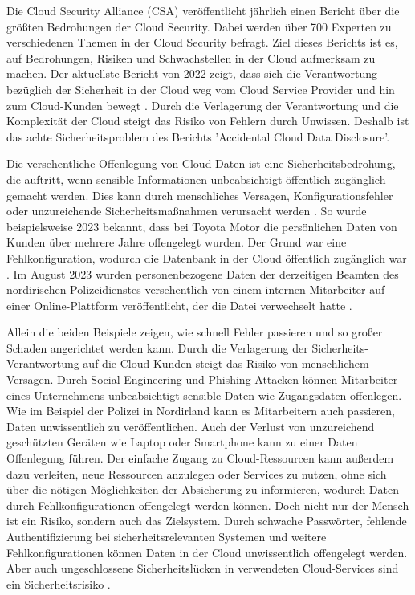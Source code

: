 Die Cloud Security Alliance (CSA) veröffentlicht jährlich einen Bericht über die größten Bedrohungen der Cloud Security. Dabei werden über 700 Experten zu verschiedenen Themen in der Cloud Security befragt. Ziel dieses Berichts ist es, auf Bedrohungen, Risiken und Schwachstellen in der Cloud aufmerksam zu machen. Der aktuellste Bericht von 2022 zeigt, dass sich die Verantwortung bezüglich der Sicherheit in der Cloud weg vom Cloud Service Provider und hin zum Cloud-Kunden bewegt \cite{CloudSecurityAlliance.2022}. %
Durch die Verlagerung der Verantwortung und die Komplexität der Cloud steigt das Risiko von Fehlern durch Unwissen. Deshalb ist das achte Sicherheitsproblem des Berichts 'Accidental Cloud Data Disclosure'.

Die versehentliche Offenlegung von Cloud Daten ist eine Sicherheitsbedrohung, die auftritt, wenn sensible Informationen unbeabsichtigt öffentlich zugänglich gemacht werden. Dies kann durch menschliches Versagen, Konfigurationsfehler oder unzureichende Sicherheitsmaßnahmen verursacht werden \cite{CloudSecurityAlliance.2022}. %
So wurde beispielsweise 2023 bekannt, dass bei Toyota Motor die persönlichen Daten von Kunden über mehrere Jahre offengelegt wurden. Der Grund war eine Fehlkonfiguration, wodurch die Datenbank in der Cloud öffentlich zugänglich war \cite{Whittaker.2023}.
Im August 2023 wurden personenbezogene Daten der derzeitigen Beamten des nordirischen Polizeidienstes versehentlich von einem internen Mitarbeiter auf einer Online-Plattform veröffentlicht, der die Datei verwechselt hatte \cite{PSNI.2023}.


Allein die beiden Beispiele zeigen, wie schnell Fehler passieren und so großer Schaden angerichtet werden kann. Durch die Verlagerung der Sicherheits-Verantwortung auf die Cloud-Kunden steigt das Risiko von menschlichem Versagen. Durch Social Engineering und Phishing-Attacken können Mitarbeiter eines Unternehmens unbeabsichtigt sensible Daten wie Zugangsdaten offenlegen. Wie im Beispiel der Polizei in Nordirland kann es Mitarbeitern auch passieren, Daten unwissentlich zu veröffentlichen. Auch der Verlust von unzureichend geschützten Geräten wie Laptop oder Smartphone kann zu einer Daten Offenlegung führen. Der einfache Zugang zu Cloud-Ressourcen kann außerdem dazu verleiten, neue Ressourcen anzulegen oder Services zu nutzen, ohne sich über die nötigen Möglichkeiten der Absicherung zu informieren, wodurch Daten durch Fehlkonfigurationen offengelegt werden können. Doch nicht nur der Mensch ist ein Risiko, sondern auch das Zielsystem. Durch schwache Passwörter, fehlende Authentifizierung bei sicherheitsrelevanten Systemen und weitere Fehlkonfigurationen können Daten in der Cloud unwissentlich offengelegt werden. Aber auch ungeschlossene Sicherheitslücken in verwendeten Cloud-Services sind ein Sicherheitsrisiko \cite{Trabelsi.2019}\cite{Brindha.2015}.

